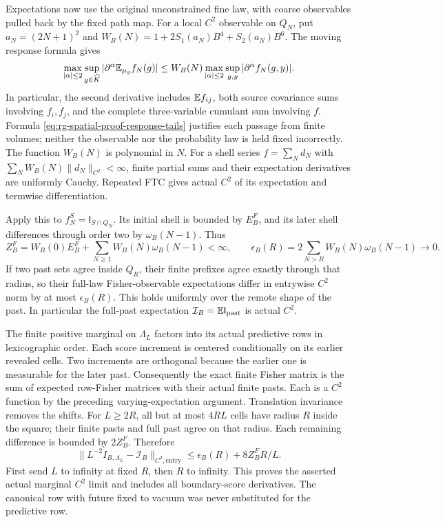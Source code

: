 Expectations now use the original unconstrained fine law, with coarse
observables pulled back by the fixed path map. For a local \(C^2\)
observable on \(Q_N\), put \(a_N=(2N+1)^2\) and
\(W_B(N)=1+2S_1(a_N)B^4+S_2(a_N)B^6\). The moving response formula gives
\begin{equation}
 \max_{|\alpha|\le2}\sup_{g\in\widehat K}
      |\partial^\alpha\mathbb E_{\mu_g}f_N(g)|
 \le W_B(N)\max_{|\alpha|\le2}\sup_{g,y}|\partial^\alpha f_N(g,y)|.
 \label{eq:rg-spatial-proof-varying-expectation-bound}
\end{equation}
In particular, the second derivative includes \(\mathbb E f_{ij}\), both
source covariance sums involving \(f_i,f_j\), and the complete
three-variable cumulant sum involving \(f\). Formula
\cref{eq:rg-spatial-proof-response-tails} justifies each passage from
finite volumes; neither the observable nor the probability law is held
fixed incorrectly. The function \(W_B(N)\) is polynomial in \(N\).
For a shell series \(f=\sum_Nd_N\) with
\(\sum_NW_B(N)\|d_N\|_{C^2}<\infty\), finite partial sums and their
expectation derivatives are uniformly Cauchy. Repeated FTC gives actual
\(C^2\) of its expectation and termwise differentiation.

Apply this to \(f_N^S=\mathsf I_{S\cap Q_N}\). Its initial shell is
bounded by \(E_B^F\), and its later shell differences through order two
by \(\omega_B(N-1)\). Thus
\begin{equation}
 Z_B^F=W_B(0)E_B^F+\sum_{N\ge1}W_B(N)\omega_B(N-1)<\infty,
 \qquad
 \epsilon_B(R)=2\sum_{N>R}W_B(N)\omega_B(N-1)\longrightarrow0.
 \label{eq:rg-spatial-proof-fisher-expectation-tails}
\end{equation}
If two past sets agree inside \(Q_R\), their finite prefixes agree
exactly through that radius, so their full-law Fisher-observable
expectations differ in entrywise \(C^2\) norm by at most
\(\epsilon_B(R)\). This holds uniformly over the remote shape of the
past. In particular the full-past expectation
\(\mathcal I_B=\mathbb E\mathsf I_{\mathrm{past}}\) is actual \(C^2\).

The finite positive marginal on \(\Lambda_L\) factors into its actual
predictive rows in lexicographic order. Each score increment is centered
conditionally on its earlier revealed cells. Two increments are
orthogonal because the earlier one is measurable for the later past.
Consequently the exact finite Fisher matrix is the sum of expected
row-Fisher matrices with their actual finite pasts. Each is a \(C^2\)
function by the preceding varying-expectation argument. Translation
invariance removes the shifts. For \(L\ge2R\), all but at most
\(4RL\) cells have radius \(R\) inside the square; their finite pasts
and full past agree on that radius. Each remaining difference is bounded
by \(2Z_B^F\). Therefore
\begin{equation}
 \|L^{-2}I_{B,\Lambda_L}-\mathcal I_B\|_{C^2,\mathrm{entry}}
 \le\epsilon_B(R)+8Z_B^F R/L.
 \label{eq:rg-spatial-proof-actual-fisher-limit}
\end{equation}
First send \(L\) to infinity at fixed \(R\), then \(R\) to infinity.
This proves the asserted actual marginal \(C^2\) limit and includes all
boundary-score derivatives. The canonical row with future fixed to vacuum
was never substituted for the predictive row.


